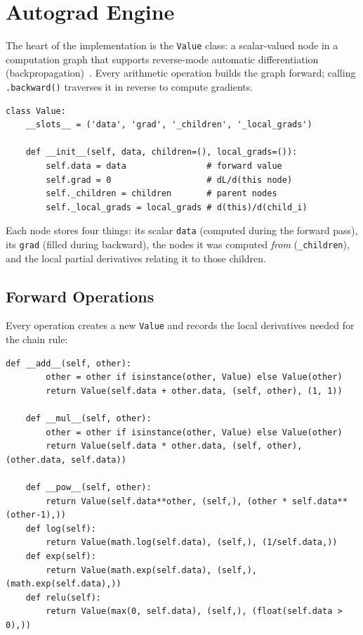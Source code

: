 \documentclass[11pt,a4paper]{article}
\begin{document}
\section{Autograd Engine}

The heart of the implementation is the \texttt{Value} class: a scalar-valued node in a computation graph that supports reverse-mode automatic differentiation (backpropagation)~\cite{rumelhart1986learning}. Every arithmetic operation builds the graph forward; calling \texttt{.backward()} traverses it in reverse to compute gradients.

\begin{lstlisting}[firstnumber=81]
class Value:
    __slots__ = ('data', 'grad', '_children', '_local_grads')

    def __init__(self, data, children=(), local_grads=()):
        self.data = data                # forward value
        self.grad = 0                   # dL/d(this node)
        self._children = children       # parent nodes
        self._local_grads = local_grads # d(this)/d(child_i)
\end{lstlisting}

Each node stores four things: its scalar \texttt{data} (computed during the forward pass), its \texttt{grad} (filled during backward), the nodes it was computed \textit{from} (\texttt{\_children}), and the local partial derivatives relating it to those children.

\subsection{Forward Operations}

Every operation creates a new \texttt{Value} and records the local derivatives needed for the chain rule:

\begin{lstlisting}[firstnumber=90]
    def __add__(self, other):
        other = other if isinstance(other, Value) else Value(other)
        return Value(self.data + other.data, (self, other), (1, 1))

    def __mul__(self, other):
        other = other if isinstance(other, Value) else Value(other)
        return Value(self.data * other.data, (self, other), (other.data, self.data))

    def __pow__(self, other):
        return Value(self.data**other, (self,), (other * self.data**(other-1),))
    def log(self):
        return Value(math.log(self.data), (self,), (1/self.data,))
    def exp(self):
        return Value(math.exp(self.data), (self,), (math.exp(self.data),))
    def relu(self):
        return Value(max(0, self.data), (self,), (float(self.data > 0),))
\end{lstlisting}
\end{document}
